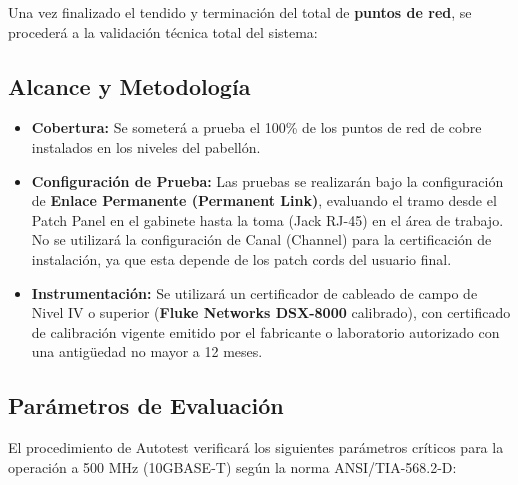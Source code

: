 Una vez finalizado el tendido y terminación del total de \textbf{\totalPuntos{} puntos de red}, se procederá a la validación técnica total del sistema:

\subsection*{Alcance y Metodología}

\begin{itemize}
    \item \textbf{Cobertura:} Se someterá a prueba el 100\% de los puntos de red de cobre instalados en los \totalPisos{} niveles del pabellón.
    \item \textbf{Configuración de Prueba:} Las pruebas se realizarán bajo la configuración de \textbf{Enlace Permanente (Permanent Link)}, evaluando el tramo desde el Patch Panel en el gabinete hasta la toma (Jack RJ-45) en el área de trabajo. No se utilizará la configuración de Canal (Channel) para la certificación de instalación, ya que esta depende de los patch cords del usuario final.
    \item \textbf{Instrumentación:} Se utilizará un certificador de cableado de campo de Nivel IV o superior (\textbf{Fluke Networks DSX-8000} calibrado), con certificado de calibración vigente emitido por el fabricante o laboratorio autorizado con una antigüedad no mayor a 12 meses.
\end{itemize}

\subsection*{Parámetros de Evaluación}

El procedimiento de Autotest verificará los siguientes parámetros críticos para la operación a 500 MHz (10GBASE-T) según la norma ANSI/TIA-568.2-D:


